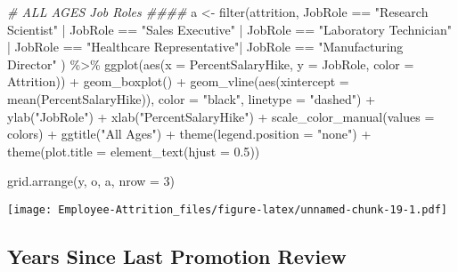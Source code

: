 \documentclass[
]{article}
\newenvironment{Shaded}{\begin{snugshade}}{\end{snugshade}}
\newcommand{\AttributeTok}[1]{\textcolor[rgb]{0.77,0.63,0.00}{#1}}
\newcommand{\CommentTok}[1]{\textcolor[rgb]{0.56,0.35,0.01}{\textit{#1}}}
\newcommand{\DecValTok}[1]{\textcolor[rgb]{0.00,0.00,0.81}{#1}}
\newcommand{\FloatTok}[1]{\textcolor[rgb]{0.00,0.00,0.81}{#1}}
\newcommand{\FunctionTok}[1]{\textcolor[rgb]{0.00,0.00,0.00}{#1}}
\newcommand{\NormalTok}[1]{#1}
\newcommand{\OtherTok}[1]{\textcolor[rgb]{0.56,0.35,0.01}{#1}}
\newcommand{\SpecialCharTok}[1]{\textcolor[rgb]{0.00,0.00,0.00}{#1}}
\newcommand{\StringTok}[1]{\textcolor[rgb]{0.31,0.60,0.02}{#1}}
\begin{document}
\begin{Shaded}
\begin{Highlighting}[]
\CommentTok{\# ALL AGES Job Roles \#\#\#\#}
\NormalTok{a }\OtherTok{\textless{}{-}} \FunctionTok{filter}\NormalTok{(attrition, JobRole }\SpecialCharTok{==} \StringTok{"Research Scientist"} \SpecialCharTok{|}\NormalTok{ JobRole }\SpecialCharTok{==} \StringTok{"Sales Executive"}  \SpecialCharTok{|}\NormalTok{ JobRole }\SpecialCharTok{==} \StringTok{"Laboratory Technician"} \SpecialCharTok{|}\NormalTok{ JobRole }\SpecialCharTok{==} \StringTok{"Healthcare Representative"}\SpecialCharTok{|}\NormalTok{ JobRole }\SpecialCharTok{==} \StringTok{"Manufacturing Director"}\NormalTok{ ) }\SpecialCharTok{\%\textgreater{}\%}
  \FunctionTok{ggplot}\NormalTok{(}\FunctionTok{aes}\NormalTok{(}\AttributeTok{x =}\NormalTok{ PercentSalaryHike, }\AttributeTok{y =}\NormalTok{ JobRole, }\AttributeTok{color =}\NormalTok{ Attrition)) }\SpecialCharTok{+}
  \FunctionTok{geom\_boxplot}\NormalTok{() }\SpecialCharTok{+}
  \FunctionTok{geom\_vline}\NormalTok{(}\FunctionTok{aes}\NormalTok{(}\AttributeTok{xintercept =} \FunctionTok{mean}\NormalTok{(PercentSalaryHike)), }\AttributeTok{color =} \StringTok{"black"}\NormalTok{, }\AttributeTok{linetype =} \StringTok{"dashed"}\NormalTok{) }\SpecialCharTok{+}
  \FunctionTok{ylab}\NormalTok{(}\StringTok{"JobRole"}\NormalTok{) }\SpecialCharTok{+}
  \FunctionTok{xlab}\NormalTok{(}\StringTok{"PercentSalaryHike"}\NormalTok{) }\SpecialCharTok{+}
  \FunctionTok{scale\_color\_manual}\NormalTok{(}\AttributeTok{values =}\NormalTok{ colors) }\SpecialCharTok{+}
  \FunctionTok{ggtitle}\NormalTok{(}\StringTok{"All Ages"}\NormalTok{) }\SpecialCharTok{+}
  \FunctionTok{theme}\NormalTok{(}\AttributeTok{legend.position =} \StringTok{"none"}\NormalTok{) }\SpecialCharTok{+}
  \FunctionTok{theme}\NormalTok{(}\AttributeTok{plot.title =} \FunctionTok{element\_text}\NormalTok{(}\AttributeTok{hjust =} \FloatTok{0.5}\NormalTok{)) }

\FunctionTok{grid.arrange}\NormalTok{(y, o, a, }\AttributeTok{nrow =} \DecValTok{3}\NormalTok{)}
\end{Highlighting}
\end{Shaded}

\texttt{[image: Employee-Attrition\_files/figure-latex/unnamed-chunk-19-1.pdf]}

\hypertarget{years-since-last-promotion-review}{%
\subsection{Years Since Last Promotion
Review}\label{years-since-last-promotion-review}}
\end{document}
